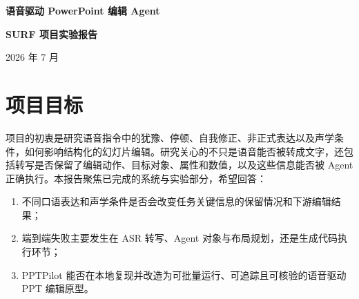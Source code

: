 \documentclass[11pt,a4paper,UTF8,fontset=fandol]{ctexart}
\begin{document}
\begin{center}
\vspace*{1.8cm}
{\bfseries 语音驱动 PowerPoint 编辑 Agent\par}
\vspace{0.8em}
{\bfseries SURF 项目实验报告\par}
\vspace{1.2em}
{\large 2026 年 7 月\par}
\end{center}
\thispagestyle{empty}

\vspace{1.6em}
\begin{abstract}
本项目以 PPTArena 论文提出的 PPTPilot 为执行 Agent，面向 SURF 项目“语音指令到可执行幻灯片编辑”的研究目标，完成了论文代码本地化、GUI 复现、CLI 重构、双 ASR 接入和端到端实验。最终系统能够保存音频转写、Agent 运行日志、编辑后 PPTX 及核验结果。

实验选用 faster-whisper large-v3-turbo 和 Qwen3-ASR-1.7B 两种转写模型，从数据组整理的语音数据中选取 4 类幻灯片编辑任务，每类包含 16 个口语与声学条件组合，共 64 条音频。文本修正、标题字号和页码任务可用确定性规则判定，图片布局任务则需结合对象几何与页面渲染。首轮实验中，Qwen3-ASR 相比 faster-whisper 将前三类任务的正确率从 66.67\% 提高到 79.17\%；图片布局任务在两种 ASR 下均为 10/16，未随转写模型更换而改善。对 id31 图片水平居中任务，进一步核查两种 ASR 模型在第一轮和第二轮编辑后的共 64 个版面结果，其中 37 个（57.8\%）通过几何与视觉核验，主要失败表现为多张图片在居中后发生重叠。

结果表明，更强 ASR 能减少关键数值和单位的丢失，但高质量转写并不足以保证正确编辑；对象定位、生成代码可靠性以及结果验证同样决定端到端成功。本项目的主要成果是一条可运行、可追踪、可分层核验的语音驱动幻灯片编辑实验链路。
\end{abstract}

\newpage

\section{项目目标}

项目的初衷是研究语音指令中的犹豫、停顿、自我修正、非正式表达以及声学条件，如何影响结构化的幻灯片编辑。研究关心的不只是语音能否被转成文字，还包括转写是否保留了编辑动作、目标对象、属性和数值，以及这些信息能否被 Agent 正确执行。本报告聚焦已完成的系统与实验部分，希望回答：

\begin{enumerate}
  \item 不同口语表达和声学条件是否会改变任务关键信息的保留情况和下游编辑结果；
  \item 端到端失败主要发生在 ASR 转写、Agent 对象与布局规划，还是生成代码执行环节；
  \item PPTPilot 能否在本地复现并改造为可批量运行、可追踪且可核验的语音驱动 PPT 编辑原型。
\end{enumerate}
\end{document}

